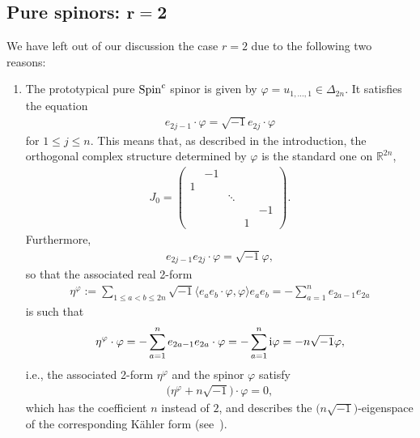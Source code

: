 \documentclass[pdftex]{sigma}
\numberwithin{equation}{section}
\begin{document}
\subsection[Pure spinors: $r=2$]{Pure spinors: $\boldsymbol{r=2}$}

We have left out of our discussion the case $r=2$ due to the following two reasons:
\begin{enumerate}\itemsep=0pt
\item The prototypical pure ${\rm Spin}^c$ spinor is given by $\varphi=u_{1,\dots,1}\in\Delta_{2n}$. It satisfies the equation
\begin{gather*}e_{2j-1}\cdot \varphi = \sqrt{-1} e_{2j}\cdot\varphi\end{gather*}
for $1\leq j\leq n$.
This means that, as described in the introduction, the orthogonal complex structure determined by $\varphi$ is the standard one on $\mathbb{R}^{2n}$,
\begin{gather*}J_0=\left(
\begin{matrix}
 & -1 & & & \\
1 & & & & \\
 & & \ddots & & \\
 & & & & -1\\
 & & & 1 &
\end{matrix}
\right).\end{gather*}
Furthermore,
\begin{gather*} e_{2j-1}e_{2j}\cdot\varphi = \sqrt{-1} \varphi ,\end{gather*}
so that the associated real 2-form
\begin{gather*}
\eta^\varphi := \sum_{1\leq a<b\leq 2n} \sqrt{-1}\langle e_a e_b \cdot \varphi,\varphi\rangle e_ae_b= -\sum_{a=1}^n e_{2a-1}e_{2a}
\end{gather*}
is such that
\begin{gather*}
 \eta^\varphi\cdot\varphi = -\sum_{a=1}^n e_{2a-1}e_{2a}\cdot\varphi= -\sum_{a=1}^n {\rm i}\varphi= - n \sqrt{-1} \varphi,
\end{gather*}
i.e., the associated 2-form $\eta^\varphi$ and the spinor $\varphi$ satisfy
\begin{gather*}\big(\eta^\varphi + n \sqrt{-1}\big)\cdot \varphi =0,\end{gather*}
which has the coefficient $n$ instead of $2$, and describes the $\big(n\sqrt{-1}\big)$-eigenspace of the corresponding K\"ahler form (see~\cite{Friedrich}).


\end{enumerate}
\end{document}
